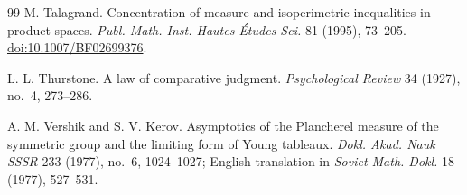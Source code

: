 \documentclass[11pt]{article}
\theoremstyle{remark}
\begin{document}
\begin{thebibliography}{99}
M. Talagrand.
\newblock Concentration of measure and isoperimetric inequalities in product
spaces.
\newblock \emph{Publ. Math. Inst. Hautes \'{E}tudes Sci.} 81 (1995), 73--205.
\newblock \href{https://doi.org/10.1007/BF02699376}
{doi:10.1007/BF02699376}.

L. L. Thurstone.
\newblock A law of comparative judgment.
\newblock \emph{Psychological Review} 34 (1927), no.~4, 273--286.

A. M. Vershik and S. V. Kerov.
\newblock Asymptotics of the Plancherel measure of the symmetric group and the
limiting form of Young tableaux.
\newblock \emph{Dokl. Akad. Nauk SSSR} 233 (1977), no.~6, 1024--1027;
English translation in \emph{Soviet Math. Dokl.} 18 (1977), 527--531.

\end{thebibliography}
\end{document}
